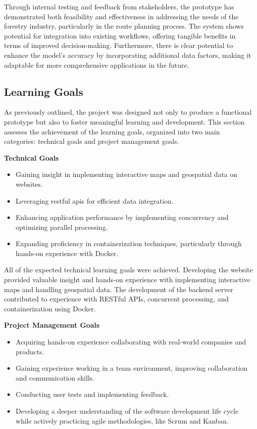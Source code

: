 Through internal testing and feedback from stakeholders, the prototype has demonstrated both feasibility and effectiveness in addressing the needs of the forestry industry, particularly in the route planning process. The system shows potential for integration into existing workflows, offering tangible benefits in terms of improved decision-making. Furthermore, there is clear potential to enhance the model's accuracy by incorporating additional data factors, making it adaptable for more comprehensive applications in the future.

\subsection{Learning Goals}

As previously outlined, the project was designed not only to produce a functional prototype but also to foster meaningful learning and development. This section assesses the achievement of the learning goals, organized into two main categories: technical goals and project management goals.

\textbf{Technical Goals}
\begin{itemize}
    \item Gaining insight in implementing interactive maps and geospatial data on websites.
    \item Leveraging \acrshort{rest}ful \acrshort{api}s for efficient data integration.
    \item Enhancing application performance by implementing concurrency and optimizing parallel processing.
    \item Expanding proficiency in containerization techniques, particularly through hands-on experience with Docker.
\end{itemize}

All of the expected technical learning goals were achieved. Developing the website provided valuable insight and hands-on experience with implementing interactive maps and handling geospatial data. The development of the backend server contributed to experience with RESTful APIs, concurrent processing, and containerization using Docker.

\textbf{Project Management Goals}
\begin{itemize}
    \item Acquiring hands-on experience collaborating with real-world companies and products.
    \item Gaining experience working in a team environment, improving collaboration and communication skills.
    \item Conducting user tests and implementing feedback. 
    \item Developing a deeper understanding of the software development life cycle while actively practicing agile methodologies, like Scrum and Kanban.
\end{itemize}

